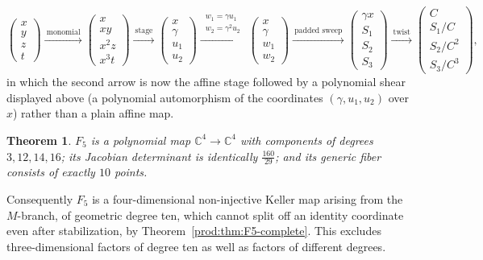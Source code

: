 \documentclass[11pt]{article}
\numberwithin{equation}{section}
\theoremstyle{plain}
\newtheorem{theorem}{Theorem}[section]
\theoremstyle{definition}
\theoremstyle{remark}
\newcommand{\C}{\mathbb{C}}
\begin{document}
\[
\begin{pmatrix}x\\ y\\ z\\ t\end{pmatrix}
\xrightarrow{\ \text{monomial}\ }
\begin{pmatrix}x\\ xy\\ x^2z\\ x^3t\end{pmatrix}
\xrightarrow{\ \text{stage}\ }
\begin{pmatrix}x\\ \gamma\\ u_1\\ u_2\end{pmatrix}
\xrightarrow{\ \substack{w_1=\gamma u_1\\[1pt] w_2=\gamma^2u_2}\ }
\begin{pmatrix}x\\ \gamma\\ w_1\\ w_2\end{pmatrix}
\xrightarrow{\ \text{padded sweep}\ }
\begin{pmatrix}\gamma x\\ S_1\\ S_2\\ S_3\end{pmatrix}
\xrightarrow{\ \text{twist}\ }
\begin{pmatrix}C\\ S_1/C\\ S_2/C^2\\ S_3/C^3\end{pmatrix},
\]
in which the second arrow is now the affine stage followed by a polynomial shear displayed above
(a polynomial automorphism of the coordinates $(\gamma,u_1,u_2)$ over $x$)
rather than a plain affine map.

\begin{theorem}\label{thm:F5}
$F_5$ is a polynomial map $\C^4\to\C^4$ with components of degrees $3,12,14,16$;
its Jacobian determinant is identically $\tfrac{160}{29}$; and its generic fiber
consists of exactly $10$ points.
\end{theorem}

Consequently $F_5$ is a four-dimensional
non-injective Keller map arising from the $M$-branch, of geometric degree ten,
which cannot split off an identity coordinate even after stabilization,
by Theorem~\ref{prod:thm:F5-complete}. This excludes three-dimensional
factors of degree ten as well as factors of different degrees.
\end{document}
